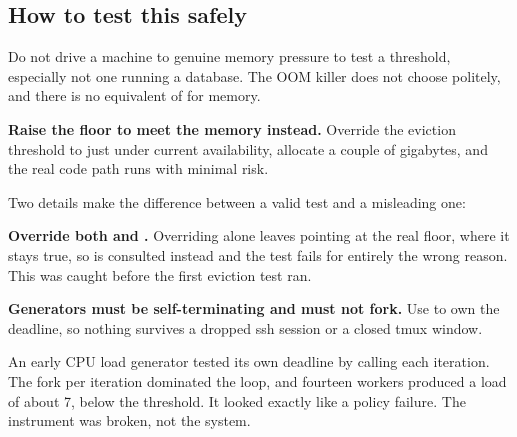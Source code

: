 \subsection{How to test this safely}

\begin{trap}
Do not drive a machine to genuine memory pressure to test a threshold,
especially not one running a database. The OOM killer does not choose politely,
and there is no equivalent of  for memory.
\end{trap}

\textbf{Raise the floor to meet the memory instead.} Override the eviction
threshold to just under current availability, allocate a couple of gigabytes, and
the real code path runs with minimal risk.

Two details make the difference between a valid test and a misleading one:

\textbf{Override both  and .} Overriding
 alone leaves  pointing at the real floor, where it
stays true, so  is consulted instead and the test fails for entirely
the wrong reason. This was caught before the first eviction test ran.

\textbf{Generators must be self-terminating and must not fork.} Use 
to own the deadline, so nothing survives a dropped ssh session or a closed tmux
window.

\begin{trap}
An early CPU load generator tested its own deadline by calling 
each iteration. The fork per iteration dominated the loop, and fourteen workers
produced a load of about 7, below the threshold. It looked exactly like a
policy failure. The instrument was broken, not the system.
\end{trap}
